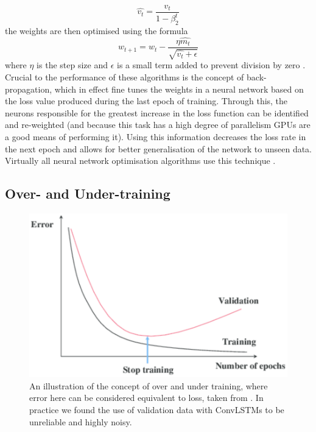 \begin{equation}
    \hat{v_t}=\frac{v_t}{1-\beta_2^t}
    \label{eq:adam4}
\end{equation}
the weights are then optimised using the formula
\begin{equation}
    w_{t+1} = w_t -\frac{\eta \hat{m_t}}{\sqrt{\hat{v_t}+\epsilon}}
    \label{eq:adamfinal}
\end{equation}
where $\eta$ is the step size and $\epsilon$ is a small term added to prevent division by zero \cite{adam}.
Crucial to the performance of these algorithms is the concept of back-propagation, which in effect fine tunes the weights in a neural network based on the loss value produced during the last epoch of training. Through this, the neurons responsible for the greatest increase in the loss function can be identified and re-weighted (and because this task has a high degree of parallelism GPUs are a good means of performing it). Using this information decreases the loss rate in the next epoch and allows for better generalisation of the network to unseen data. Virtually all neural network optimisation algorithms use this technique \cite{goodfellow2016deep}.

\subsection{Over- and Under-training}
\begin{figure}[ht] 
        \centering \includegraphics[width=0.7\columnwidth]{figures/overtrain.png}
        \caption{
                \label{fig:earlystop} %
                An illustration of the concept of over and under training, where error here can be considered equivalent to loss, taken from \cite{earlystop}. In practice we found the use of validation data with ConvLSTMs to be unreliable and highly noisy.
        }
\end{figure}

